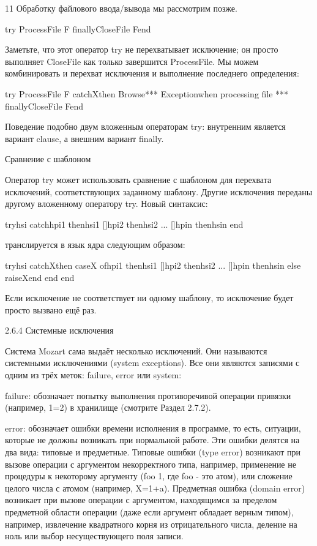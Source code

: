 11 Обработку файлового ввода/вывода мы рассмотрим позже.

try
{ProcessFile F}
finally{CloseFile F}end

Заметьте, что этот оператор try не перехватывает исключение; он просто выполняет CloseFile как только завершится ProcessFile. Мы можем комбинировать и перехват исключения и выполнение последнего определения:

try
{ProcessFile F}
catchXthen
{Browse*** Exceptionwhen processing file ***}
finally{CloseFile F}end

Поведение подобно двум вложенным операторам try: внутренним является вариант clause, а внешним вариант finally.

Сравнение с шаблоном

Оператор try может использовать сравнение с шаблоном для перехвата исключений, соответствующих заданному шаблону. Другие исключения переданы другому вложенному оператору try. Новый синтаксис:

tryhsi
catchhpi1 thenhsi1
[]hpi2 thenhsi2
...
[]hpin thenhsin
end

транслируется в язык ядра следующим образом:

tryhsi
catchXthen
caseX
ofhpi1 thenhsi1
[]hpi2 thenhsi2
...
[]hpin thenhsin
else raiseXend
end
end

Если исключение не соответствует ни одному шаблону, то исключение будет просто вызвано ещё раз.

2.6.4 Системные исключения

Система Mozart сама выдаёт несколько исключений. Они называются системными исключениями (system exceptions). Все они являются записями с одним из трёх меток: failure, error или system:

failure: обозначает попытку выполнения противоречивой операции привязки (например, 1=2) в хранилище (смотрите Раздел 2.7.2).

error: обозначает ошибки времени исполнения в программе, то есть, ситуации, которые не должны возникать при нормальной работе. Эти ошибки делятся на два вида: типовые и предметные. Типовые ошибки (type error) возникают при вызове операции с аргументом некорректного типа, например, применение не процедуры к некоторому аргументу ({foo 1}, где foo - это атом), или сложение целого числа с атомом (например, X=1+a). Предметная ошибка (domain error) возникает при вызове операции с аргументом, находящимся за пределом предметной области операции (даже если аргумент обладает верным типом), например, извлечение квадратного корня из отрицательного числа, деление на ноль или выбор несуществующего поля записи.

